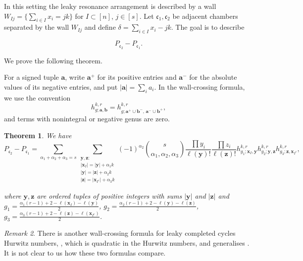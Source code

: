 \documentclass[10pt,a4paper,oneside,no-math,reqno]{amsart}%
\theoremstyle{plain}
\newtheorem{theorem}{Theorem}[section]
\theoremstyle{definition}
\theoremstyle{remark}
\newtheorem{remark}[theorem]{Remark}
\numberwithin{equation}{section}
\newcommand{\1}{\mathds{1}}
\newcommand{\<}{\langle}
\renewcommand{\>}{\rangle}
\begin{document}
In this setting the leaky resonance arrangement is described by a wall $W_{Ij}=\{\sum_{i\in I}x_i=jk\}$ for $I\subset [n]$, $j\in[s]$. Let $\mathfrak{c}_1,\mathfrak{c}_2$ be adjacent chambers separated by the wall $W_{Ij}$ and define $\delta=\sum_{i\in I}x_i-jk$. The goal is to describe

\begin{equation}
    P_{\mathfrak{c}_2}-P_{\mathfrak{c}_1}.
\end{equation}

We prove the following theorem.

For a signed tuple $\mathbf{a}$, write $\mathbf{a}^+$ for its positive entries and $\mathbf{a}^-$ for the absolute values of its negative entries, and put $|\mathbf{a}|=\sum_i a_i$. In the wall-crossing formula, we use the convention
\begin{equation}
    h^{k,r}_{g;\mathbf{a},\mathbf{b}}
    =
    h^{k,r}_{g;\mathbf{a}^+\cup\mathbf{b}^-,\,\mathbf{a}^-\cup\mathbf{b}^+},
\end{equation}
and terms with nonintegral or negative genus are zero.

\begin{theorem}
    \label{thm-WC}
    We have
    \begin{equation}
        P_{\mathfrak{c}_2}-P_{\mathfrak{c}_1}
        =
        \sum_{\alpha_1+\alpha_2+\alpha_3=s}
        \sum_{\substack{\mathbf{y},\mathbf{z}\colon\\ |\mathbf{x}_I|=|\mathbf{y}|+\alpha_1k
        \\
        |\mathbf{y}|=|\mathbf{z}|+\alpha_2 k
        \\
        |\mathbf{z}|=|\mathbf{x}_{I^{c}}|+\alpha_3k}}(-1)^{\alpha_2}\binom{s}{\alpha_1,\alpha_2,\alpha_3}\frac{\prod y_i}{\ell(\mathbf{y})!}\frac{\prod z_i}{\ell(\mathbf{z})!}h^{k,r}_{g_1;\mathbf{x}_I,\mathbf{y}} h^{k,r}_{g_2;\mathbf{y},\mathbf{z}} h^{k,r}_{g_3;\mathbf{z},\mathbf{x}_{I^c}},
    \end{equation}

    where $\mathbf{y},\mathbf{z}$ are ordered tuples of positive integers with sums $|\mathbf{y}|$ and $|\mathbf{z}|$ and $g_1=\frac{\alpha_1(r-1)+2-\ell(\mathbf{x}_I)-\ell(\mathbf{y})}{2}$, $g_2=\frac{\alpha_2(r-1)+2-\ell(\mathbf{y})-\ell(\mathbf{z})}{2}$, $g_3=\frac{\alpha_3(r-1)+2-\ell(\mathbf{z})-\ell(\mathbf{x}_{I^c})}{2}$.
\end{theorem}

\begin{remark}
    There is another wall-crossing formula for leaky completed cycles Hurwitz numbers, \cite[Theorem 6.1]{AKL25}, which is quadratic in the Hurwitz numbers, and generalises \cite[Theorem 1.5]{Joh15}. It is not clear to us how these two formulas compare.
\end{remark}
\end{document}

